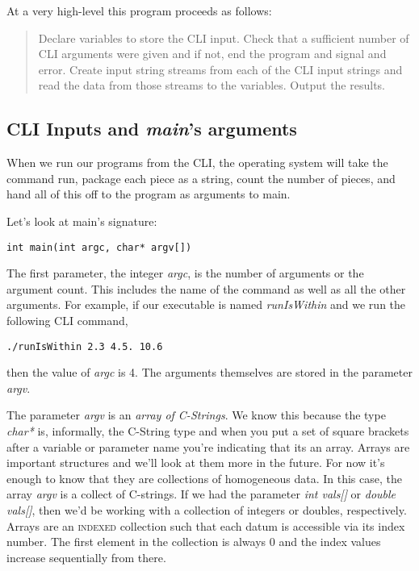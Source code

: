 \documentclass[]{tufte-handout}
\begin{document}
At a very high-level this program proceeds as follows:
\begin{quote}
Declare variables to store the CLI input. Check that a sufficient number of CLI arguments were given and if not, end the program and signal and error. Create input string streams from each of the CLI input strings and read the data from those streams to the variables. Output the results.
\end{quote}

\subsection{CLI Inputs and \textit{main}'s arguments}

When we run our programs from the CLI, the operating system will take the command run, package each piece as a string, count the number of pieces, and hand all of this off to the program as arguments to main.

Let's look at main's signature:
\begin{verbatim}
int main(int argc, char* argv[])
\end{verbatim}
The first parameter, the integer \textit{argc}, is the number of arguments or the argument count. This includes the name of the command as well as all the other arguments. For example, if our executable is named \textit{runIsWithin} and we run the following CLI command,
\begin{verbatim}
./runIsWithin 2.3 4.5. 10.6
\end{verbatim}
then the value of \textit{argc} is 4. The arguments themselves are stored in the parameter \textit{argv}.

The parameter \textit{argv} is an \textit{array of C-Strings}. We know this because the type \textit{char*} is, informally, the C-String type and when you put a set of square brackets after a variable or parameter name you're indicating that its an array. Arrays are important structures and we'll look at them more in the future. For now it's enough to know that they are collections of homogeneous data. In this case, the array \textit{argv} is a collect of C-strings. If we had the parameter \textit{int vals[]} or \textit{double vals[]}, then we'd be working with a collection of integers or doubles, respectively. Arrays are an \textsc{indexed} collection such that each datum is accessible via its index number. The first element in the collection is always 0 and the index values increase sequentially from there.
\end{document}
